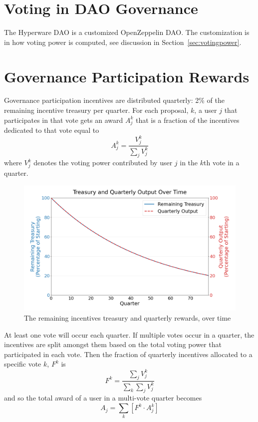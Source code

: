 \documentclass{article}
\begin{document}
\section{Voting in DAO Governance}\label{sec:voting}

The Hyperware DAO is a customized OpenZeppelin DAO.
The customization is in how voting power is computed, see discussion in Section~\ref{sec:votingpower}.

\section{Governance Participation Rewards}\label{sec:rewards}

Governance participation incentives are distributed quarterly: 2\% of the remaining incentive treasury per quarter.
For each proposal, $k$, a user $j$ that participates in that vote gets an award $A^{k}_j$ that is a fraction of the incentives dedicated to that vote equal to
\begin{equation}
A^{k}_j = \frac{V^{k}_j}{\sum_j V^{k}_j}
\end{equation}
where $V^{k}_j$ denotes the voting power contributed by user $j$ in the $k$th vote in a quarter.

\begin{figure}[h]
    \centering
    \includegraphics[width=\textwidth]{incentives-treasury-over-time.png}
    \caption{The remaining incentives treasury and quarterly rewards, over time}
    \label{fig:incentives}
\end{figure}

At least one vote will occur each quarter.
If multiple votes occur in a quarter, the incentives are split amongst them based on the total voting power that participated in each vote.
Then the fraction of quarterly incentives allocated to a specific vote $k$, $F^{k}$ is
\begin{equation}
F^{k} = \frac{\sum_j V^{k}_j}{\sum_k \sum_j V^{k}_j}
\end{equation}
and so the total award of a user in a multi-vote quarter becomes
\begin{equation}
A_j = \sum_k \left[F^{k} \cdot A^{k}_j\right]
\end{equation}
\end{document}
